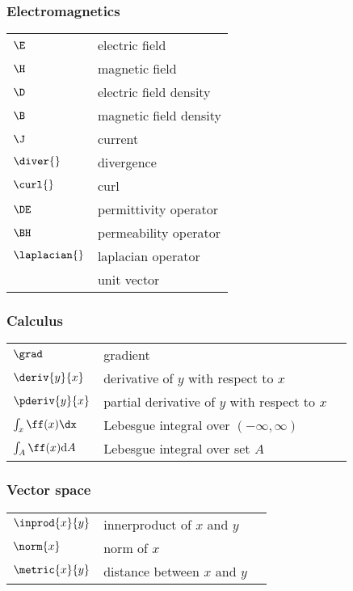 \subsubsection*{Electromagnetics}
\begin{tabular}{ll}
   $\E          $ & electric field           \\
   $\H          $ & magnetic field           \\
   $\D          $ & electric field density   \\
   $\B          $ & magnetic field density   \\
   $\J          $ & current                  \\
   $\diver{}    $ & divergence               \\
   $\curl{}     $ & curl                     \\
   $\DE         $ & permittivity operator    \\
   $\BH         $ & permeability operator    \\
   $\laplacian{}$ & laplacian operator       \\
   $\unit{}     $ & unit vector
\end{tabular}

\subsubsection*{Calculus}
\begin{tabular}{lll}
   $\grad        $ & gradient                                      \\
   $\deriv{y}{x} $ & derivative of $y$ with respect to $x$         \\
   $\pderiv{y}{x}$ & partial derivative of $y$ with respect to $x$ \\
   $\int_x \ff(x)\dx$ & Lebesgue integral over $(-\infty,\infty)$    \\
   $\int_A \ff(x) \mathrm{d}A$ & Lebesgue integral over set $A$              \\
\end{tabular}


\subsubsection*{Vector space}
\begin{tabular}{lll}
   $\inprod{x}{y}$ & innerproduct of $x$ and $y$   \\
   $\norm{x}     $ & norm of $x$                   \\
   $\metric{x}{y}  $ & distance between $x$ and $y$  \\
\end{tabular}

